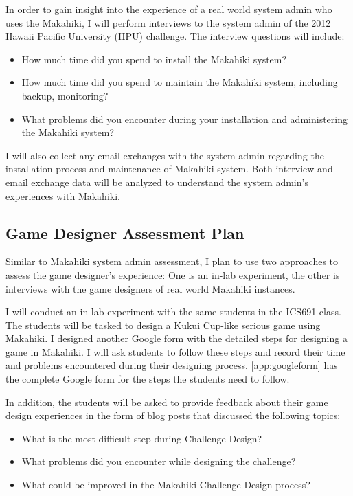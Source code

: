 In order to gain insight into the experience of a real world system admin who uses the Makahiki, I will perform interviews to the system admin of the 2012 Hawaii Pacific University (HPU) challenge. The interview questions will include:
\begin{itemize}
 \item How much time did you spend to install the Makahiki system?
 \item How much time did you spend to maintain the Makahiki system, including backup, monitoring?
 \item What problems did you encounter during your installation and administering the Makahiki system?
\end{itemize}

I will also collect any email exchanges with the system admin regarding the installation process and maintenance of Makahiki system. Both interview and email exchange data will be analyzed to understand the system admin's experiences with Makahiki.  

\subsection{Game Designer Assessment Plan}

Similar to Makahiki system admin assessment, I plan to use two approaches to assess the game designer's experience: One is an in-lab experiment, the other is interviews with the game designers of real world Makahiki instances.

I will conduct an in-lab experiment with the same students in the ICS691 class. The students will be tasked to design a Kukui Cup-like serious game using Makahiki. I designed another Google form with the detailed steps for designing a game in Makahiki. I will ask students to follow these steps and record their time and problems encountered during their designing process. \autoref{app:googleform} has the complete Google form for the steps the students need to follow.

In addition, the students will be asked to provide feedback about their game design experiences in the form of blog posts that discussed the following topics:
\begin{itemize}
\item What is the most difficult step during Challenge Design?
\item What problems did you encounter while designing the challenge?
\item What could be improved in the Makahiki Challenge Design process?
\end{itemize}

